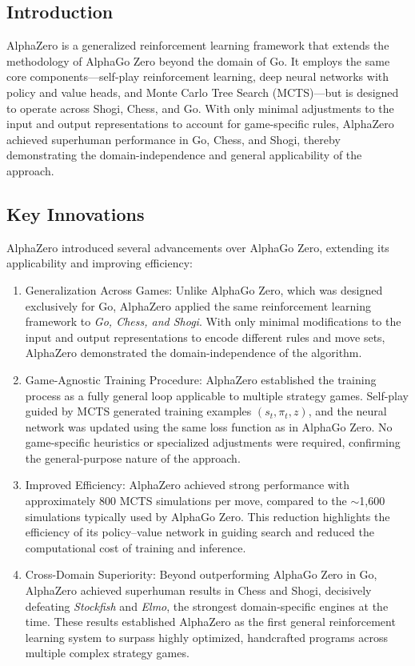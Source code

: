 \subsection{Introduction}

AlphaZero is a generalized reinforcement learning framework that extends the methodology of AlphaGo Zero beyond the domain of Go. It employs the same core components—self-play reinforcement learning, deep neural networks with policy and value heads, and Monte Carlo Tree Search (MCTS)—but is designed to operate across Shogi, Chess, and Go. With only minimal adjustments to the input and output representations to account for game-specific rules, AlphaZero achieved superhuman performance in Go, Chess, and Shogi, thereby demonstrating the domain-independence and general applicability of the approach.

\subsection{Key Innovations}
AlphaZero introduced several advancements over AlphaGo Zero, 
extending its applicability and improving efficiency:

\begin{enumerate}
    \item Generalization Across Games: Unlike AlphaGo Zero, 
    which was designed exclusively for Go, AlphaZero applied the 
    same reinforcement learning framework to \textit{Go, Chess, and Shogi}. 
    With only minimal modifications to the input and output representations 
    to encode different rules and move sets, AlphaZero demonstrated 
    the domain-independence of the algorithm.
    
    \item Game-Agnostic Training Procedure: AlphaZero 
    established the training process as a fully general loop applicable 
    to multiple strategy games. Self-play guided by MCTS generated 
    training examples $(s_t, \pi_t, z)$, and the neural network was 
    updated using the same loss function as in AlphaGo Zero. 
    No game-specific heuristics or specialized adjustments were required, 
    confirming the general-purpose nature of the approach.
    
    \item Improved Efficiency: AlphaZero achieved strong 
    performance with approximately 800 MCTS simulations per move, 
    compared to the $\sim$1,600 simulations typically used by AlphaGo Zero. 
    This reduction highlights the efficiency of its policy--value network 
    in guiding search and reduced the computational cost of training 
    and inference.
    
    \item Cross-Domain Superiority: Beyond outperforming 
    AlphaGo Zero in Go, AlphaZero achieved superhuman results in Chess 
    and Shogi, decisively defeating \textit{Stockfish} and \textit{Elmo}, 
    the strongest domain-specific engines at the time. These results 
    established AlphaZero as the first general reinforcement learning 
    system to surpass highly optimized, handcrafted programs across 
    multiple complex strategy games.
\end{enumerate}

